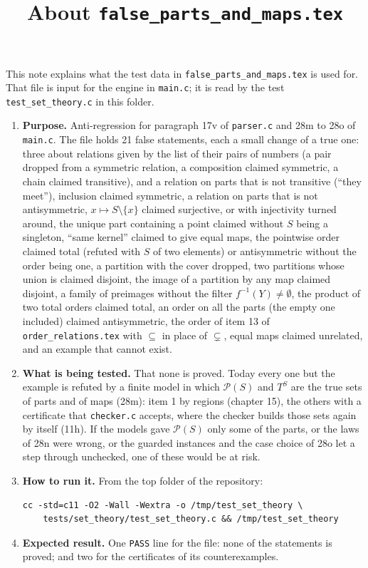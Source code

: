 \documentclass[11pt,a4paper]{article}
\title{About \texttt{false\_parts\_and\_maps.tex}}
\author{}
\date{}
\begin{document}
\maketitle
This note explains what the test data in \texttt{false\_parts\_and\_maps.tex} is used for. That file is input for the engine in \texttt{main.c}; it is read by the test \texttt{test\_set\_theory.c} in this folder.

\begin{enumerate}
\item \textbf{Purpose.} Anti-regression for paragraph 17v of \texttt{parser.c} and 28m to 28o of \texttt{main.c}. The file holds 21 false statements, each a small change of a true one: three about relations given by the list of their pairs of numbers (a pair dropped from a symmetric relation, a composition claimed symmetric, a chain claimed transitive), and a relation on parts that is not transitive (``they meet''), inclusion claimed symmetric, a relation on parts that is not antisymmetric, $x \mapsto S \setminus \{x\}$ claimed surjective, or with injectivity turned around, the unique part containing a point claimed without $S$ being a singleton, ``same kernel'' claimed to give equal maps, the pointwise order claimed total (refuted with $S$ of two elements) or antisymmetric without the order being one, a partition with the cover dropped, two partitions whose union is claimed disjoint, the image of a partition by any map claimed disjoint, a family of preimages without the filter $f^{-1}(Y) \neq \emptyset$, the product of two total orders claimed total, an order on all the parts (the empty one included) claimed antisymmetric, the order of item 13 of \texttt{order\_relations.tex} with $\subseteq$ in place of $\subsetneq$, equal maps claimed unrelated, and an example that cannot exist.

\item \textbf{What is being tested.} That none is proved. Today every one but the example is refuted by a finite model in which $\mathcal{P}(S)$ and $T^{S}$ are the true sets of parts and of maps (28m): item 1 by regions (chapter 15), the others with a certificate that \texttt{checker.c} accepts, where the checker builds those sets again by itself (11h). If the models gave $\mathcal{P}(S)$ only some of the parts, or the laws of 28n were wrong, or the guarded instances and the case choice of 28o let a step through unchecked, one of these would be at risk.

\item \textbf{How to run it.} From the top folder of the repository:
\begin{verbatim}
cc -std=c11 -O2 -Wall -Wextra -o /tmp/test_set_theory \
    tests/set_theory/test_set_theory.c && /tmp/test_set_theory
\end{verbatim}

\item \textbf{Expected result.} One \texttt{PASS} line for the file: none of the statements is proved; and two for the certificates of its counterexamples.
\end{enumerate}
\end{document}
